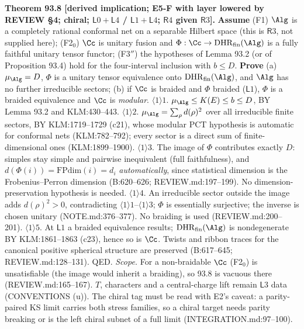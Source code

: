 \textbf{Theorem 93.8 [derived implication; E5-F with layer lowered by REVIEW \S4; chiral; \(\mathsf L0{+}\mathsf L4\) /
\(\mathsf L1{+}\mathsf L4\); \(\mathsf R4\) given \(\mathsf R3\)].}  \textbf{Assume}
(F1) \(\Alg\) is a completely rational conformal net on a separable Hilbert space (this is \(\mathsf R3\), not supplied here);
(F2\(_0\)) \(\Cc\) is unitary fusion and \(\Phi:\Cc\to\mathrm{DHR}_{\mathrm{fin}}(\Alg)\) is a fully faithful unitary tensor functor;
(F3\(''\)) the hypotheses of Lemma 93.2 (or of Proposition 93.4) hold for the four-interval inclusion with \(b\le D\).
\textbf{Prove} (a) \(\mu_\Alg=D\), \(\Phi\) is a unitary tensor equivalence onto \(\mathrm{DHR}_{\mathrm{fin}}(\Alg)\), and \(\Alg\) has no
further irreducible sectors; (b) if \(\Cc\) is braided and \(\Phi\) braided (\(\mathsf L1\)), \(\Phi\) is a braided equivalence and
\(\Cc\) is \emph{modular}.
\(\langle1\rangle1\). \(\mu_\Alg\le K(E)\le b\le D\), BY Lemma 93.2 and KLM:430--443.
\(\langle1\rangle2\). \(\mu_\Alg=\sum_\rho d(\rho)^2\) over all irreducible finite sectors, BY KLM:1719--1729 (c21), whose modular
PCT hypothesis is automatic for conformal nets (KLM:782--792); every sector is a direct sum of finite-dimensional ones
(KLM:1899--1900).
\(\langle1\rangle3\). The image of \(\Phi\) contributes exactly \(D\): simples stay simple and pairwise inequivalent (full
faithfulness), and \(d(\Phi(i))=\mathrm{FPdim}(i)=d_i\) \emph{automatically}, since statistical dimension is the
Frobenius--Perron dimension (B:620--626; REVIEW.md:197--199).  No dimension-preservation hypothesis is needed.
\(\langle1\rangle4\). An irreducible sector outside the image adds \(d(\rho)^2>0\), contradicting \(\langle1\rangle1\)--\(\langle1\rangle3\);
\(\Phi\) is essentially surjective; the inverse is chosen unitary (NOTE.md:376--377).  No braiding is used (REVIEW.md:200--201).
\(\langle1\rangle5\). At \(\mathsf L1\) a braided equivalence results; \(\mathrm{DHR}_{\mathrm{fin}}(\Alg)\) is nondegenerate BY KLM:1861--1863
(c23), hence so is \(\Cc\).  Twists and ribbon traces for the canonical positive spherical structure are preserved
(B:617--645; REVIEW.md:128--131).  QED.
\emph{Scope.}  For a non-braidable \(\Cc\) (F2\(_0\)) is unsatisfiable (the image would inherit a braiding), so 93.8 is vacuous
there (REVIEW.md:165--167).  \(T\), characters and a central-charge lift remain \(\mathsf L3\) data (CONVENTIONS (u)).
The chiral tag must be read with E2's caveat: a parity-paired KS limit carries both stress families, so a chiral target
needs parity breaking or is the left chiral subnet of a full limit (INTEGRATION.md:97--100).

